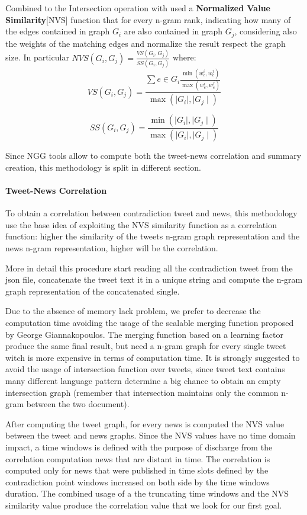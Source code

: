 Combined to the Intersection operation with used a \textbf{Normalized Value Similarity}[NVS] function that for every n-gram rank, indicating how many of the edges contained in graph $G_i$ are also contained in graph $G_j$, considering also the weights of the matching edges and normalize the result respect the graph size. In particular $NVS(G_i,G_j) = \frac{VS(G_i,G_j)}{SS(G_i,G_j)}$ where:
\begin{equation}
 VS(G_i,G_j)=\frac{\sum e \in G_i \frac{\min(w_e^i, w_e^j)}{\max(w_e^i, w_e^j)}}{\max(\mid G_i \mid, \mid G_j \mid)}
\end{equation}

\begin{equation}
 SS(G_i,G_j)=\frac{\min(\mid G_i \mid, \mid G_j \mid)}{\max(\mid G_i \mid, \mid G_j \mid)}
\end{equation}

Since NGG tools allow to compute both the tweet-news correlation and summary creation, this methodology is split in different section.
\paragraph{Tweet-News Correlation}
To obtain a correlation between contradiction tweet and news, this methodology use the base idea of exploiting the NVS similarity function as a correlation function: higher the similarity of the tweets n-gram graph representation and the news n-gram representation, higher will be the correlation.

More in detail this procedure start reading all the contradiction tweet from the json file, concatenate the tweet text it in a unique string and compute the n-gram graph representation of the concatenated single. 

Due to the absence of memory lack problem, we prefer to decrease the computation time avoiding the usage of the scalable merging function proposed by George Giannakopoulos. The merging function based on a learning factor produce the same final result, but need a n-gram graph for every single tweet witch is more expensive in terms of computation time. It is strongly suggested to avoid the usage of intersection function over tweets, since tweet text contains many different language pattern determine a big chance to obtain an empty intersection graph (remember that intersection maintains only the common n-gram between the two document).

After computing the tweet graph, for every news is computed the NVS value between the tweet and news graphs. Since the NVS values have no time domain impact, a time windows is defined with the purpose of discharge from the correlation computation news that are distant in time. The correlation is computed only for news that were published in time slots defined by the contradiction point windows increased on both side by the time windows duration. The combined usage of a the truncating time windows  and the NVS similarity value produce the correlation value that we look for our first goal.

